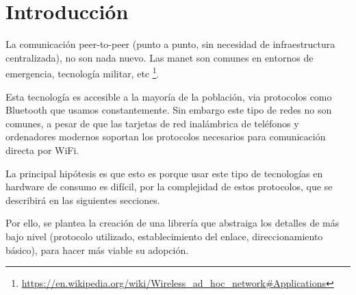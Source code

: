 \chapter{Introducción}

La comunicación peer-to-peer (punto a punto, sin necesidad de infraestructura
centralizada), no son nada nuevo. Las \gls{manet} son comunes en entornos de
emergencia, tecnología militar, etc \footnote{\url{https://en.wikipedia.org/wiki/Wireless_ad_hoc_network\#Applications}}.

Esta tecnología es accesible a la mayoría de la población, via protocolos como
Bluetooth que usamos constantemente. Sin embargo este tipo de redes no son
comunes, a pesar de que las tarjetas de red inalámbrica de teléfonos y
ordenadores modernos soportan los protocolos necesarios para comunicación
directa por WiFi.

La principal hipótesis es que esto es porque usar este tipo de tecnologías en
hardware de consumo es difícil, por la complejidad de estos protocolos, que se
describirá en las siguientes secciones.

Por ello, se plantea la creación de una librería que abstraiga los detalles de
más bajo nivel (protocolo utilizado, establecimiento del enlace,
direccionamiento básico), para hacer más viable su adopción.
